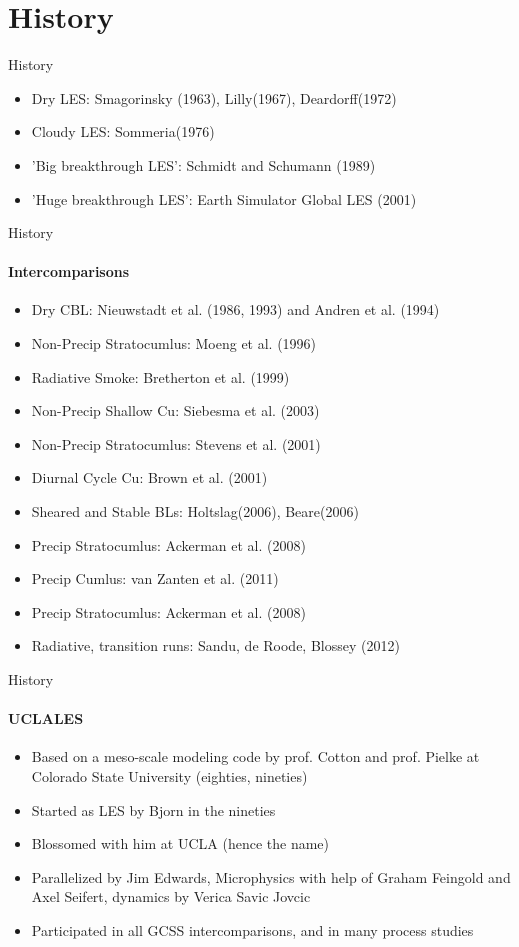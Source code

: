 \section{History}
 
\begin{frame}{History}
 \begin{itemize}
  \item Dry LES: Smagorinsky (1963), Lilly(1967), Deardorff(1972)
  \item Cloudy LES: Sommeria(1976)
  \item 'Big breakthrough LES': Schmidt and Schumann (1989)
  \item 'Huge breakthrough LES': Earth Simulator Global LES (2001) 
 \end{itemize}

\end{frame}

\begin{frame}[allowframebreaks]{History}
\framesubtitle{Intercomparisons}
\begin{itemize}
 \item \alert{Dry CBL}:  Nieuwstadt et al. (1986, 1993) and Andren et al. (1994)
 \item \alert{Non-Precip Stratocumlus}: Moeng et al. (1996)
 \item \alert{Radiative Smoke}: Bretherton et al. (1999)
 \item \alert{Non-Precip Shallow Cu}: Siebesma et al. (2003)
 \item \alert{Non-Precip Stratocumlus}: Stevens et al. (2001)
 \item \alert{Diurnal Cycle Cu}: Brown et al. (2001)
 \item \alert{Sheared and Stable BLs}: Holtslag(2006), Beare(2006)
 \item \alert{Precip Stratocumlus}: Ackerman et al. (2008)
 \item \alert{Precip Cumlus}: van Zanten et al. (2011)
 \item \alert{Precip Stratocumlus}: Ackerman et al. (2008)
 \item \alert{Radiative, transition runs}: Sandu, de Roode, Blossey (2012)
\end{itemize}
 
\end{frame}

\begin{frame}{History}
\framesubtitle{UCLALES}
 \begin{itemize}
  \item Based on a meso-scale modeling code by prof. Cotton and prof. Pielke at Colorado State University  (eighties, nineties)
  \item Started as LES by Bjorn in the nineties
  \item Blossomed with him at UCLA (hence the name)
  \item Parallelized by Jim Edwards, Microphysics with help of Graham Feingold and Axel Seifert, dynamics by Verica Savic Jovcic
  \item Participated in all GCSS intercomparisons, and in many process studies
 \end{itemize}

\end{frame}

